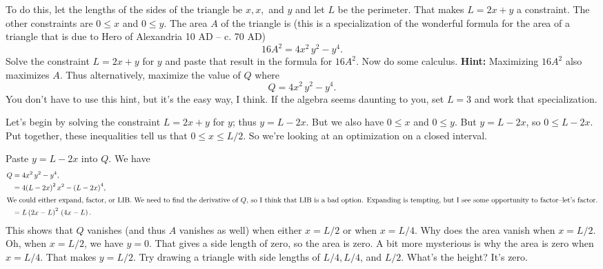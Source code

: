 \documentclass[12pt,fleqn,answers]{exam}
\begin{document}
\begin{questions}
    \quad To do this, let the lengths of the sides of the triangle be $x,x,$
    and $y$ and let $L$ be the perimeter. That makes $L = 2 x + y$ a
    constraint. The other constraints are $0 \leq x$ and $0 \leq y$.
    The area $A$ of the triangle is (this is a specialization of 
    the wonderful formula for the area of a triangle that is due to Hero of Alexandria 
    10 AD – c. 70 AD)
    \begin{equation*}
        16 {{A}^{2}}=4 {{x}^{2}}\, {{y}^{2}}-{{y}^{4}}.
    \end{equation*}
    Solve the constraint $L = 2 x + y$ for $y$ and paste that
    result in  the formula for $16 A^2$. Now do some calculus.
    \textbf{Hint:} Maximizing $16 A^2$ also maximizes $A$.  Thus
    alternatively, maximize the value of $Q$ where
    \begin{equation*}
        Q =4 {{x}^{2}}\, {{y}^{2}}-{{y}^{4}}.
    \end{equation*}
    You
    don't have to use this hint, but it's the easy way, I think.
    \quad If the algebra seems daunting to you, set $L = 3$ and work
    that specialization. 


   \begin{solution}
   Let's begin by solving the constraint  $L = 2 x + y$ for $y$; thus  $y = L - 2 x$.  
   But we also have $0 \leq x$ and $0 \leq y$.  But $y = L - 2 x$, so 
   $0 \leq L - 2x$. Put together, these inequalities tell us that
   $0 \leq x \leq L/2$. So we're looking at an optimization on a
   closed interval. 
   
   Paste $y = L - 2 x$ into $Q$. We have
   \begin{align*}
      Q  &=4 {{x}^{2}}\, {{y}^{2}}-{{y}^{4}},\\
          &= 4 {{\left( L-2 x\right) }^{2}}\, {{x}^{2}}-{{\left( L-2 x\right) }^{4}}, \\
          \intertext{We could either expand, factor, or LIB. We need to find the
          derivative of $Q$, so I think that LIB is a bad option.
          Expanding is tempting, but I see some opportunity to factor--let's factor.}
          &= L\, {{\left( 2 x-L\right) }^{2}}\, \left( 4 x-L\right).       
   \end{align*}
   This shows that $Q$ vanishes (and thus $A$ vanishes as well) when
   either $x = L/2$ or when $x = L/4$. Why does the area vanish when
   $x = L/2$. Oh, when $x = L/2$, we have $y = 0$. That gives a side
   length of zero, so the area is zero. A bit more 
   mysterious is why the area is zero when $x = L/4$.
   That makes $y = L/2$. Try drawing a triangle with
   side lengths of $L/4, L/4$, and $L/2$. What's
   the height?  It's zero.


\end{solution}
\end{questions}
\end{document}
